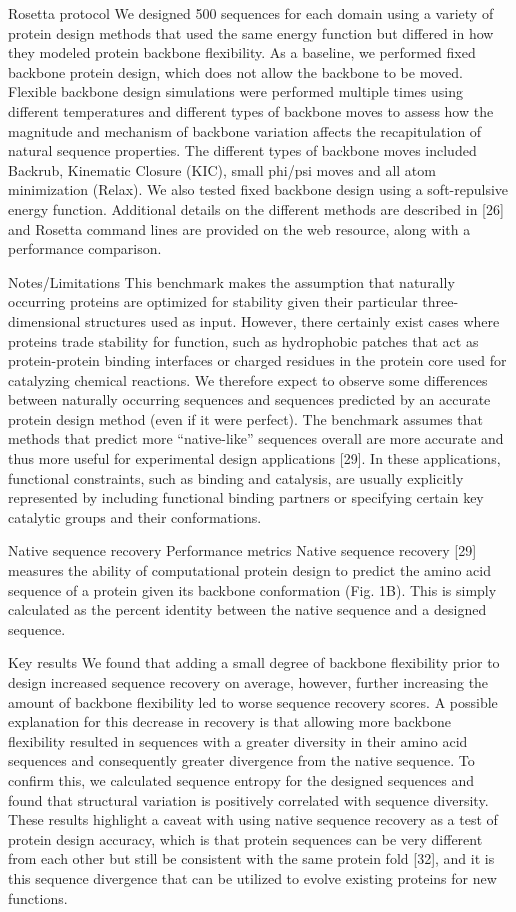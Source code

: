 Rosetta protocol
We designed 500 sequences for each domain using a variety of protein design methods that used the same energy function but differed in how they modeled protein backbone flexibility. As a baseline, we performed fixed backbone protein design, which does not allow the backbone to be moved. Flexible backbone design simulations were performed multiple times using different temperatures and different types of backbone moves to assess how the magnitude and mechanism of backbone variation affects the recapitulation of natural sequence properties. The different types of backbone moves included Backrub, Kinematic Closure (KIC), small phi/psi moves and all atom minimization (Relax). We also tested fixed backbone design using a soft-repulsive energy function. Additional details on the different methods are described in [26] and Rosetta command lines are provided on the web resource, along with a performance comparison.

Notes/Limitations
This benchmark makes the assumption that naturally occurring proteins are optimized for stability given their particular three-dimensional structures used as input. However, there certainly exist cases where proteins trade stability for function, such as hydrophobic patches that act as protein-protein binding interfaces or charged residues in the protein core used for catalyzing chemical reactions. We therefore expect to observe some differences between naturally occurring sequences and sequences predicted by an accurate protein design method (even if it were perfect). The benchmark assumes that methods that predict more “native-like” sequences overall are more accurate and thus more useful for experimental design applications [29]. In these applications, functional constraints, such as binding and catalysis, are usually explicitly represented by including functional binding partners or specifying certain key catalytic groups and their conformations.

Native sequence recovery
Performance metrics
Native sequence recovery [29] measures the ability of computational protein design to predict the amino acid sequence of a protein given its backbone conformation (Fig. 1B). This is simply calculated as the percent identity between the native sequence and a designed sequence.

Key results
We found that adding a small degree of backbone flexibility prior to design increased sequence recovery on average, however, further increasing the amount of backbone flexibility led to worse sequence recovery scores. A possible explanation for this decrease in recovery is that allowing more backbone flexibility resulted in sequences with a greater diversity in their amino acid sequences and consequently greater divergence from the native sequence. To confirm this, we calculated sequence entropy for the designed sequences and found that structural variation is positively correlated with sequence diversity. These results highlight a caveat with using native sequence recovery as a test of protein design accuracy, which is that protein sequences can be very different from each other but still be consistent with the same protein fold [32], and it is this sequence divergence that can be utilized to evolve existing proteins for new functions.

